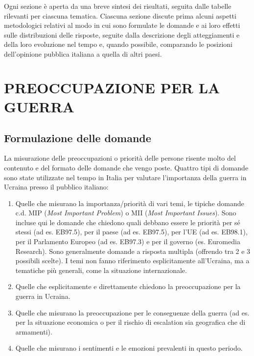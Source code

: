 \documentclass[
  openany]{book}
\begin{document}
Ogni sezione è aperta da una breve sintesi dei risultati, seguita dalle tabelle rilevanti per ciascuna tematica. Ciascuna sezione discute prima alcuni aspetti metodologici relativi al modo in cui sono formulate le domande e ai loro effetti sulle distribuzioni delle risposte, seguite dalla descrizione degli atteggiamenti e della loro evoluzione nel tempo e, quando possibile, comparando le posizioni dell'opinione pubblica italiana a quella di altri paesi.

\hypertarget{preoccupazione-per-la-guerra}{%
\chapter{PREOCCUPAZIONE PER LA GUERRA}\label{preoccupazione-per-la-guerra}}

\hypertarget{formulazione-delle-domande}{%
\section{Formulazione delle domande}\label{formulazione-delle-domande}}

La misurazione delle preoccupazioni o priorità delle persone risente molto del contenuto e del formato delle domande che vengo poste. Quattro tipi di domande sono state utilizzate nel tempo in Italia per valutare l'importanza della guerra in Ucraina presso il pubblico italiano:

\begin{enumerate}
\def\labelenumi{\alph{enumi})}
\item
  Quelle che misurano la importanza/priorità di vari temi, le tipiche domande c.d. MIP (\emph{Most Important Problem}) o MII (\emph{Most Important Issues}). Sono incluse qui le domande che chiedono quali debbano essere le priorità per sé stessi (ad es. EB97.5), per il paese (ad es. EB97.5), per l'UE (ad es. EB98.1), per il Parlamento Europeo (ad es. EB97.3) e per il governo (es. Euromedia Research). Sono generalmente domande a risposta multipla (offrendo tra 2 e 3 possibili scelte). I temi non fanno riferimento esplicitamente all'Ucraina, ma a tematiche più generali, come la situazione internazionale.
\item
  Quelle che esplicitamente e direttamente chiedono la preoccupazione per la guerra in Ucraina.
\item
  Quelle che misurano la preoccupazione per le conseguenze della guerra (ad es. per la situazione economica o per il rischio di escalation sia geografica che di armamenti).
\item
  Quelle che misurano i sentimenti e le emozioni prevalenti in questo periodo.
\end{enumerate}
\end{document}
